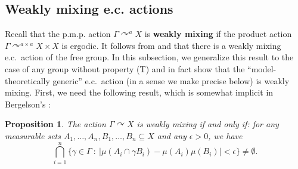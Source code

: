 \documentclass[12pt]{amsart}
\newtheorem{prop}[thm]{Proposition}
\theoremstyle{definition}
\newcommand{\pmp}{p{$.$}m{$.$}p{$.$}}
\newcommand{\acts}{\curvearrowright}
\begin{document}
\subsection{Weakly mixing e.c. actions} \label{sub:weakmixing}

Recall that the {\pmp} action $\Gamma\acts^a X$ is \textbf{weakly mixing} if the product action $\Gamma\acts^{a\times a} X\times X$ is ergodic.  It follows from \cite[Theorems 4.3 and 6.6]{BIH} and \cite{KP} that there is a weakly mixing e.c.\ action of the free group.  In this subsection, we generalize this result to the case of any group without property (T) and in fact show that the ``model-theoretically generic'' e.c.\ action (in a sense we make precise below) is weakly mixing.  First, we need the following result, which is somewhat implicit in Bergelson's \cite{bergelson}: 

\begin{prop}
The action $\Gamma\acts X$ is weakly mixing if and only if:  for any measurable sets $A_1,\ldots,A_n,B_1,\ldots,B_n\subseteq X$ and any $\epsilon>0$, we have $$\bigcap_{i=1}^n\{\gamma\in \Gamma \ : \ |\mu(A_i\cap \gamma B_i)-\mu(A_i)\mu(B_i)|<\epsilon\}\not=\emptyset.$$
\end{prop}
\end{document}

